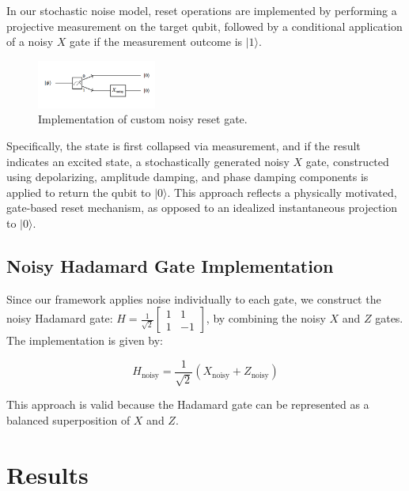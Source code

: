\documentclass[9pt,a4paper,twocolumn,twoside]{tau-class/tau}
\begin{document}
In our stochastic noise model, reset operations are implemented by performing a projective measurement on the target qubit, followed by a conditional application of a noisy \( X \) gate if the measurement outcome is \( |1\rangle \). 

\begin{figure}[H]
    \centering
    \includegraphics[width=0.35\textwidth, trim=0 120 0 120, clip]{figures/reset.jpg}
    \caption{Implementation of custom noisy reset gate.}
    \label{fig:trace_convergence}
\end{figure}

Specifically, the state is first collapsed via measurement, and if the result indicates an excited state, a stochastically generated noisy \( X \) gate, constructed using depolarizing, amplitude damping, and phase damping components is applied to return the qubit to \( |0\rangle \). This approach reflects a physically motivated, gate-based reset mechanism, as opposed to an idealized instantaneous projection to \( |0\rangle \).

\subsection{Noisy Hadamard Gate Implementation}

Since our framework applies noise individually to each gate, we construct the noisy Hadamard gate: \(H = \frac{1}{\sqrt{2}} \left[\begin{smallmatrix} 1 & 1 \\ 1 & -1 \end{smallmatrix}\right]\), by combining the noisy \( X \) and \( Z \) gates. The implementation is given by:

\begin{equation}
H_{\text{noisy}} = \frac{1}{\sqrt{2}}\left(X_{\text{noisy}} + Z_{\text{noisy}}\right)
\end{equation}

This approach is valid because the Hadamard gate can be represented as a balanced superposition of \( X \) and \( Z \).

\section{Results}
\end{document}
